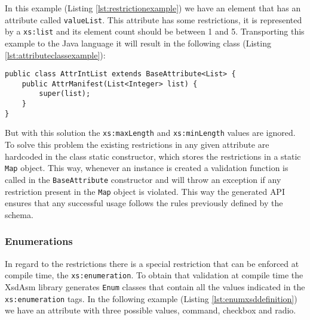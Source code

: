 \newpage

\noindent
In this example (Listing \ref{lst:restrictionexample}) we have an element that has an attribute called \texttt{valueList}. This attribute has some restrictions, it is represented by a \texttt{xs:list} and its element count should be between 1 and 5. Transporting this example to the Java language it will result in the following class (Listing \ref{lst:attributeclassexample}):

\bigskip


\begin{minipage}{\linewidth}
\begin{lstlisting}[caption={Attribute Class Example},captionpos=b,label={lst:attributeclassexample}]
public class AttrIntList extends BaseAttribute<List> {
    public AttrManifest(List<Integer> list) {
        super(list);
    }
}
\end{lstlisting}
\end{minipage}

\noindent
But with this solution the \texttt{xs:maxLength} and \texttt{xs:minLength} values are ignored. To solve this problem the existing restrictions in any given attribute are hardcoded in the class static constructor, which stores the restrictions in a static \texttt{Map} object. This way, whenever an instance is created a validation function is called in the \texttt{BaseAttribute} constructor and will throw an exception if any restriction present in the \texttt{Map} object is violated. This way the generated \ac{API} ensures that any successful usage follows the rules previously defined by the schema.

\subsubsection{Enumerations}
\label{sec:enumarations}

In regard to the restrictions there is a special restriction that can be enforced at compile time, the \texttt{xs:enumeration}. To obtain that validation at compile time the XsdAsm library generates \texttt{Enum} classes that contain all the values indicated in the \texttt{xs:enumeration} tags. In the following example (Listing \ref{lst:enumxsddefinition}) we have an attribute with three possible values, command, checkbox and radio.

\bigskip


